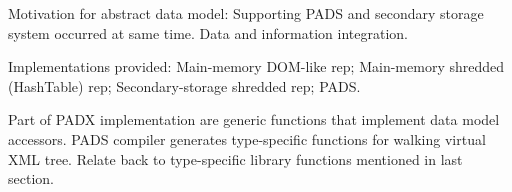 Motivation for abstract data model: Supporting PADS and secondary
storage system occurred at same time.  Data and information
integration.  

Implementations provided: Main-memory DOM-like rep; Main-memory
shredded (HashTable) rep; Secondary-storage shredded rep; PADS.

Part of PADX implementation are generic functions that implement data
model accessors.  PADS compiler generates type-specific functions for
walking virtual XML tree.  Relate back to type-specific library
functions mentioned in last section.


